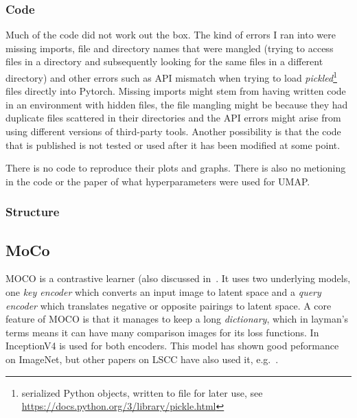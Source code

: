 \documentclass[10pt,twocolumn,letterpaper]{article}
\begin{document}
\subsubsection{Code}\label{subsubsec:code}
Much of the code did not work out the box. The kind of errors I ran into were missing imports, file and directory names that were mangled (trying to access files in a directory and subsequently looking for the same files in a different directory) and other errors such as API mismatch when trying to load \textit{pickled}\footnote{serialized Python objects, written to file for later use, see \href{https://docs.python.org/3/library/pickle.html}{https://docs.python.org/3/library/pickle.html}} files directly into Pytorch. Missing imports might stem from having written code in an environment with hidden files, the file mangling might be because they had duplicate files scattered in their directories and the API errors might arise from using different versions of third-party tools. Another possibility is that the code that is published is not tested or used after it has been modified at some point. 

There is no code to reproduce their plots and graphs. There is also no metioning in the code or the paper of what hyperparameters were used for \gls{UMAP}. 


\subsubsection{Structure}\label{subsubsec:misconception}

\subsection{MoCo}\label{subsec:moco}
\gls{MOCO}\cite{moco} is a contrastive learner (also discussed in~. It uses two underlying models, one \textit{key encoder} which converts an input image to latent space and a \textit{query encoder} which translates negative or opposite pairings to latent space. A core feature of \gls{MOCO} is that it manages to keep a long \textit{dictionary}, which in layman's terms means it can have many comparison images for its loss functions. In~\cite{sslUMAP} InceptionV4\cite{inceptionV4} is used for both encoders. This model has shown good peformance on ImageNet, but other papers on \gls{LSCC} have also used it, e.g.~\cite{otherInception}.
\end{document}
